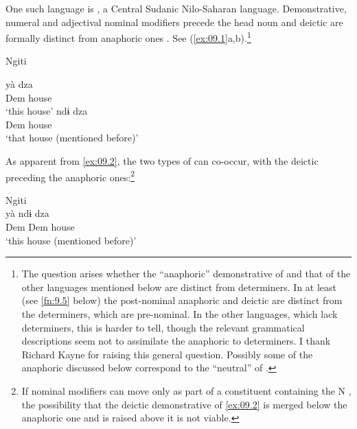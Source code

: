 \documentclass[output=paper]{langsci/langscibook}
\begin{document}
One such language is , a Central Sudanic Nilo-Saharan
language.  Demonstrative, numeral and adjectival nominal modifiers precede the
head noun\linebreak\parencite[§9]{KutschLojenga1994} and deictic  are
formally distinct from anaphoric ones
\parencite[cf.][§§9.5.1--9.5.2]{KutschLojenga1994}. See (\ref{ex:09.1}a,b).\footnote{The
    question arises whether the “anaphoric” demonstrative of  and that of the
    other languages mentioned below are distinct from determiners. In
     at
    least (see \cref{fn:9.5} below) the post-nominal anaphoric and deictic
     are distinct from the determiners, which are pre-nominal. In
    the other languages, which lack determiners, this is harder to tell, though
    the relevant grammatical descriptions seem not to assimilate the anaphoric
     to determiners. I thank Richard Kayne for raising this
    general question. Possibly some of the anaphoric  discussed
below correspond to the “neutral”  of \textcite[§11]{Kayne2014}.}

\ea\label{ex:09.1}Ngiti \parencite[373, 375]{KutschLojenga1994}\\
\begin{multicols}{2}
\ea\label{ex:09.1a}
		\gll yà dza\\
			Dem house\\
		\glt ‘this house’
    \ex\label{ex:09.1b}
		\gll  ndɨ          dza\\
			Dem house\\
		\glt ‘that house (mentioned before)’
	\z
\end{multicols}
\z

As apparent from \eqref{ex:09.2}, the two types of  can
co-occur, with the deictic  preceding the anaphoric
ones:{\footnote{If nominal modifiers can move only as part of a constituent
    containing the N \citep{Cinque2005}, the possibility that the
deictic demonstrative of \eqref{ex:09.2} is merged below the
anaphoric one and is raised above it is not viable.}}

\ea\label{ex:09.2}Ngiti \parencite[376]{KutschLojenga1994}\\
    \gll yà             ndɨ         dza   \\
            Dem Dem house\\
    \glt ‘this house (mentioned before)’
\z
\end{document}
